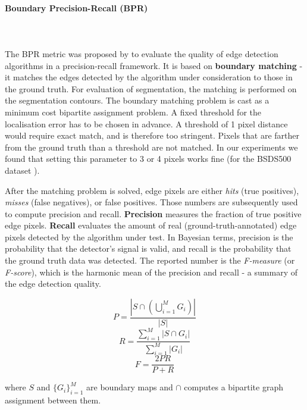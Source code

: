 \paragraph{Boundary Precision-Recall (BPR)}\mbox{}\\\mbox{}\\
\label{par:ch4-BPR-maths}
The BPR metric was proposed by \cite{Martin2004learning} %
to evaluate the quality of edge detection algorithms in a precision-recall framework. 
It is based on {\bf boundary matching} - it matches the edges detected by the algorithm under consideration %
to those in the ground truth. For evaluation of segmentation, the matching is performed on the segmentation contours. The boundary matching problem is cast as a minimum cost bipartite assignment problem. A fixed threshold for the localisation error has to be chosen in advance. A threshold of 1 pixel distance would require exact match, and is therefore too stringent. Pixels that are farther from the ground truth than a threshold are not matched. In our experiments we found that setting this parameter to 3 or 4 pixels works fine (for the BSDS500 dataset \cite{BSDS500resources}).

After the matching problem is solved, edge pixels are either {\it hits} (true positives), {\it misses} (false negatives), or false positives. Those numbers are subsequently used to compute precision and recall. 
{\bf Precision} measures the fraction of true positive edge pixels. {\bf Recall} evaluates the amount of real (\eg ground-truth-annotated) edge pixels detected by the algorithm under test. 
In Bayesian terms, precision is the probability that the detector's signal is valid, and recall is the probability that the ground truth data was detected. 
The reported number is the {\it F-measure} (or {\it F-score}), which is the harmonic mean of the precision and recall - a summary of the edge detection quality.

\begin{equation}
P=\frac{\left|S\cap\left(\bigcup\limits _{i=1}^{M}G_{i}\right)\right|}{|S|}
\end{equation}
\begin{equation}
R=\frac{{\sum\limits _{i=1}^{M}\left|S\cap G_{i}\right|}}{\sum\limits _{i=1}^{M}\left|G_{i}\right|}
\end{equation}
\begin{equation}
F=\frac{2PR}{P+R}
\end{equation}

where $S$ and $\{G_{i}\}_{i=1}^{M}$ are boundary maps and $\cap$
computes a bipartite graph assignment between them.

